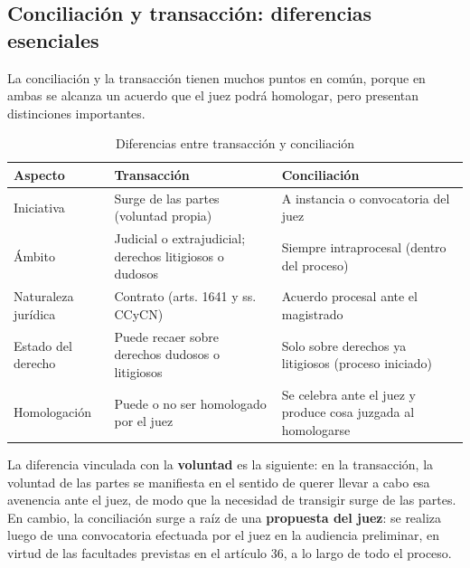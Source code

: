 \documentclass[12pt,oneside]{book}
\begin{document}
\subsection{Conciliación y transacción: diferencias esenciales}

La conciliación y la transacción tienen muchos puntos en común, porque en ambas se alcanza un acuerdo que el juez podrá homologar, pero presentan distinciones importantes.

\begin{table}[H]
\centering
\caption{Diferencias entre transacción y conciliación}
\small
\begin{tabularx}{\textwidth}{
    >{\raggedright\arraybackslash}p{}
    >{\raggedright\arraybackslash}X
    >{\raggedright\arraybackslash}X
}
\toprule
\textbf{Aspecto} & \textbf{Transacción} & \textbf{Conciliación} \\
\midrule
Iniciativa & Surge de las partes (voluntad propia) & A instancia o convocatoria del juez \\
Ámbito & Judicial o extrajudicial; derechos litigiosos o dudosos & Siempre intraprocesal (dentro del proceso) \\
Naturaleza jurídica & Contrato (arts. 1641 y ss. CCyCN) & Acuerdo procesal ante el magistrado \\
Estado del derecho & Puede recaer sobre derechos dudosos o litigiosos & Solo sobre derechos ya litigiosos (proceso iniciado) \\
Homologación & Puede o no ser homologado por el juez & Se celebra ante el juez y produce cosa juzgada al homologarse \\
\bottomrule
\end{tabularx}
\end{table}

La diferencia vinculada con la \textbf{voluntad} es la siguiente: en la transacción, la voluntad de las partes se manifiesta en el sentido de querer llevar a cabo esa avenencia ante el juez, de modo que la necesidad de transigir surge de las partes. En cambio, la conciliación surge a raíz de una \textbf{propuesta del juez}: se realiza luego de una convocatoria efectuada por el juez en la audiencia preliminar, en virtud de las facultades previstas en el artículo 36, a lo largo de todo el proceso.

\end{document}
